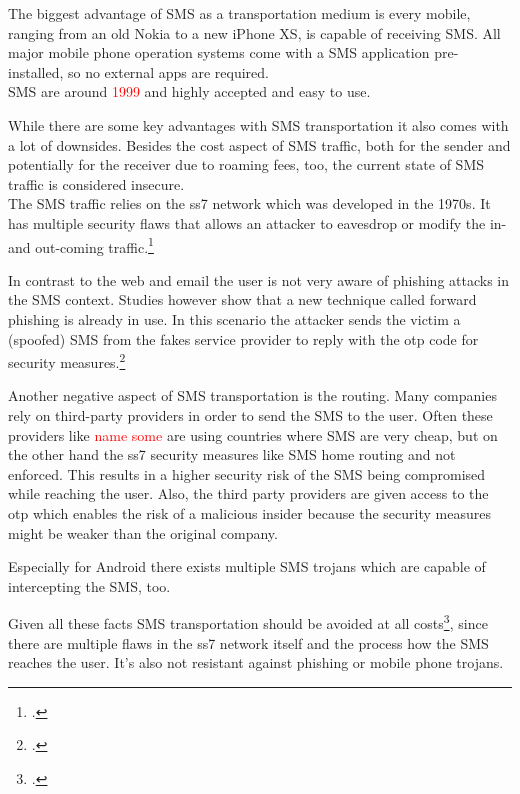 The biggest advantage of SMS as a transportation medium is every mobile, ranging from an old Nokia to a new iPhone XS, is capable of receiving SMS. All major mobile phone operation systems come with a SMS application pre-installed, so no external apps are required.\\
SMS are around \textcolor{red}{1999} and highly accepted and easy to use.

While there are some key advantages with SMS transportation it also comes with a lot of downsides. Besides the cost aspect of SMS traffic, both for the sender and potentially for the receiver due to roaming fees, too, the current state of SMS traffic is considered insecure.\\
The SMS traffic relies on the \gls{ss7} network which was developed in the 1970s. It has multiple security flaws that allows an attacker to eavesdrop or modify the in- and out-coming traffic.\footcite{WELCH201717,7997246,puzankov2017stealthy}

In contrast to the web and email the user is not very aware of phishing attacks in the SMS context. Studies however show that a new technique called forward phishing is already in use. In this scenario the attacker sends the victim a (spoofed) SMS from the fakes service provider to reply with the \gls{otp} code for security measures.\footcite{JAKOBSSON20186,SIADATI201714}

Another negative aspect of SMS transportation is the routing. Many companies rely on third-party providers in order to send the SMS to the user. Often these providers like \textcolor{red}{name some} are using countries where SMS are very cheap, but on the other hand the \gls{ss7} security measures like SMS home routing and not enforced. This results in a higher security risk of the SMS being compromised while reaching the user. Also, the third party providers are given access to the \gls{otp} which enables the risk of a malicious insider because the security measures might be weaker than the original company.

Especially for Android there exists multiple SMS trojans which are capable of intercepting the SMS, too.

Given all these facts SMS transportation should be avoided at all costs\footcite{JAKOBSSON20186}, since there are multiple flaws in the \gls{ss7} network itself and the process how the SMS reaches the user. It's also not resistant against phishing or mobile phone trojans.



